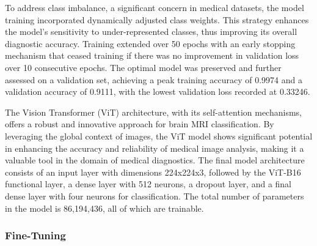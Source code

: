 To address class imbalance, a significant concern in medical datasets, the model training incorporated dynamically adjusted class weights. This strategy enhances the model's sensitivity to under-represented classes, thus improving its overall diagnostic accuracy. Training extended over 50 epochs with an early stopping mechanism that ceased training if there was no improvement in validation loss over 10 consecutive epochs. The optimal model was preserved and further assessed on a validation set, achieving a peak training accuracy of 0.9974 and a validation accuracy of 0.9111, with the lowest validation loss recorded at 0.33246.

The Vision Transformer (ViT) architecture, with its self-attention mechanisms, offers a robust and innovative approach for brain MRI classification. By leveraging the global context of images, the ViT model shows significant potential in enhancing the accuracy and reliability of medical image analysis, making it a valuable tool in the domain of medical diagnostics. The final model architecture consists of an input layer with dimensions 224x224x3, followed by the ViT-B16 functional layer, a dense layer with 512 neurons, a dropout layer, and a final dense layer with four neurons for classification. The total number of parameters in the model is 86,194,436, all of which are trainable.


\subsubsection{Fine-Tuning}




